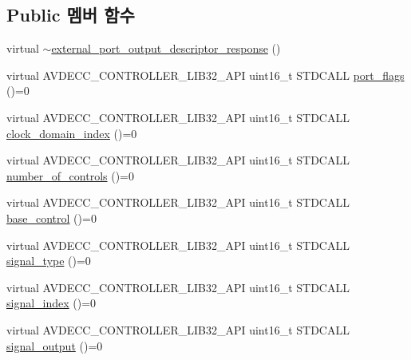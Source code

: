 \subsection*{Public 멤버 함수}
\begin{DoxyCompactItemize}
\item 
virtual \hyperlink{classavdecc__lib_1_1external__port__output__descriptor__response_ae7f948437c04cb632729afdf772f09c6}{$\sim$external\+\_\+port\+\_\+output\+\_\+descriptor\+\_\+response} ()
\item 
virtual A\+V\+D\+E\+C\+C\+\_\+\+C\+O\+N\+T\+R\+O\+L\+L\+E\+R\+\_\+\+L\+I\+B32\+\_\+\+A\+PI uint16\+\_\+t S\+T\+D\+C\+A\+LL \hyperlink{classavdecc__lib_1_1external__port__output__descriptor__response_a66bad2f1317cba04f0ea271f7181b58f}{port\+\_\+flags} ()=0
\item 
virtual A\+V\+D\+E\+C\+C\+\_\+\+C\+O\+N\+T\+R\+O\+L\+L\+E\+R\+\_\+\+L\+I\+B32\+\_\+\+A\+PI uint16\+\_\+t S\+T\+D\+C\+A\+LL \hyperlink{classavdecc__lib_1_1external__port__output__descriptor__response_aab7f93d403d8b73f8f4a8fb7c61ecded}{clock\+\_\+domain\+\_\+index} ()=0
\item 
virtual A\+V\+D\+E\+C\+C\+\_\+\+C\+O\+N\+T\+R\+O\+L\+L\+E\+R\+\_\+\+L\+I\+B32\+\_\+\+A\+PI uint16\+\_\+t S\+T\+D\+C\+A\+LL \hyperlink{classavdecc__lib_1_1external__port__output__descriptor__response_a5accf7abc7d231a0767ad5cac68b8b39}{number\+\_\+of\+\_\+controls} ()=0
\item 
virtual A\+V\+D\+E\+C\+C\+\_\+\+C\+O\+N\+T\+R\+O\+L\+L\+E\+R\+\_\+\+L\+I\+B32\+\_\+\+A\+PI uint16\+\_\+t S\+T\+D\+C\+A\+LL \hyperlink{classavdecc__lib_1_1external__port__output__descriptor__response_ac1f5297533142234c764e84c01ce5a16}{base\+\_\+control} ()=0
\item 
virtual A\+V\+D\+E\+C\+C\+\_\+\+C\+O\+N\+T\+R\+O\+L\+L\+E\+R\+\_\+\+L\+I\+B32\+\_\+\+A\+PI uint16\+\_\+t S\+T\+D\+C\+A\+LL \hyperlink{classavdecc__lib_1_1external__port__output__descriptor__response_ac204637e5ecfc30b4cc47c0d78d81ce1}{signal\+\_\+type} ()=0
\item 
virtual A\+V\+D\+E\+C\+C\+\_\+\+C\+O\+N\+T\+R\+O\+L\+L\+E\+R\+\_\+\+L\+I\+B32\+\_\+\+A\+PI uint16\+\_\+t S\+T\+D\+C\+A\+LL \hyperlink{classavdecc__lib_1_1external__port__output__descriptor__response_aa1d83268f9a492f864d3e213acf71a97}{signal\+\_\+index} ()=0
\item 
virtual A\+V\+D\+E\+C\+C\+\_\+\+C\+O\+N\+T\+R\+O\+L\+L\+E\+R\+\_\+\+L\+I\+B32\+\_\+\+A\+PI uint16\+\_\+t S\+T\+D\+C\+A\+LL \hyperlink{classavdecc__lib_1_1external__port__output__descriptor__response_a729bc59f434e7de353db02db35977dfa}{signal\+\_\+output} ()=0

\end{DoxyCompactItemize}
